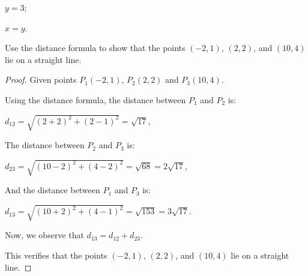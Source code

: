\begin{questions}
\begin{tasks}
\begin{solution}
    \end{solution}
    \task $y=3$;
    \begin{solution}
    \end{solution}
    \task $x=y$.
    \begin{solution}
    \end{solution}
  \end{tasks}
\item Use the distance formula to show that the points $(-2, 1)$, $(2,2)$, and $(10, 4)$ lie on a straight line.
\begin{proof}
  Given points $P_1(-2, 1)$, $P_2(2,2)$ and $P_3(10,4)$.
  
  Using the distance formula, the distance between $P_1$ and $P_2$ is:

  $d_{12} = \sqrt{(2+2)^2+(2-1)^2}=\sqrt{17}$,

  The distance between $P_2$ and $P_3$ is:

  $d_{23} = \sqrt{(10-2)^2+(4-2)^2}=\sqrt{68}=2\sqrt{17}$,

  And the distance between $P_1$ and $P_3$ is:

  $d_{13} = \sqrt{(10+2)^2+(4-1)^2}=\sqrt{153}=3\sqrt{17}$.

  Now, we observe that $d_{13} = d_{12}+d_{23}$.

  This verifies that the points $(-2, 1)$, $(2,2)$, and $(10, 4)$ lie on a straight line.
\end{proof}
\end{questions}